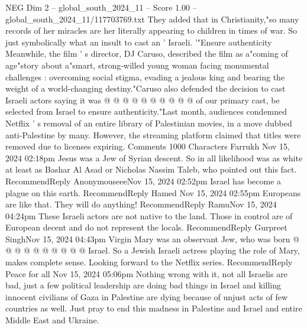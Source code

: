 \begin{textsample}{NEG Dim 2 – global\_south\_2024\_11 – Score 1.00 – global\_south\_2024\_11/117703769.txt}
They added that in Christianity,"so many records of her miracles are her literally appearing to children in times of war.
So just symbolically what an insult to cast an ' Israeli. '"Ensure authenticity Meanwhile, the film ' s director, DJ Caruso, described the film as a"coming of age"story about a"smart, strong-willed young woman facing monumental challenges : overcoming social stigma, evading a jealous king and bearing the weight of a world-changing destiny."Caruso also defended the decision to cast Israeli actors saying it was @ @ @ @ @ @ @ @ @ @ of our primary cast, be selected from Israel to ensure authenticity."Last month, audiences condemned Netflix ' s removal of an entire library of Palestinian movies, in a move dubbed anti-Palestine by many.
However, the streaming platform claimed that titles were removed due to licenses expiring.
Comments 1000 Characters Farrukh Nov 15, 2024 02:18pm Jesus was a Jew of Syrian descent.
So in all likelihood was as white at least as Bashar Al Asad or Nicholas Nassim Taleb, who pointed out this fact.
RecommendReply AnonymouseeeNov 15, 2024 02:52pm Israel has become a plague on this earth.
RecommendReply Hamed Nov 15, 2024 02:55pm Europeans are like that.
They will do anything!
RecommendReply RamuNov 15, 2024 04:24pm These Israeli actors are not native to the land.
Those in control are of European decent and do not represent the locals.
RecommendReply Gurpreet SinghNov 15, 2024 04:43pm Virgin Mary was an observant Jew, who was born @ @ @ @ @ @ @ @ @ @ Israel.
So a Jewish Israeli actress playing the role of Mary, makes complete sense.
Looking forward to the Netflix series.
RecommendReply Peace for all Nov 15, 2024 05:06pm Nothing wrong with it, not all Israelis are bad, just a few political leadership are doing bad things in Israel and killing innocent civilians of Gaza in Palestine are dying because of unjust acts of few countries as well.
Just pray to end this madness in Palestine and Israel and entire Middle East and Ukraine.

\end{textsample}
